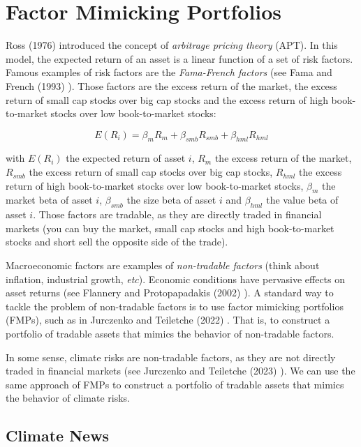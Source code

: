 \chapter{Factor Mimicking Portfolios}


Ross (1976) \cite{ross1976apt} introduced 
the concept of \textit{arbitrage pricing theory} (APT).
In this model, the expected return of an asset is
a linear function of a set of risk factors. Famous examples of risk factors are the
\textit{Fama-French factors} (see Fama and French (1993) \cite{fama1993common}).
Those factors are the excess return of the market,
the excess return of small cap stocks over big cap stocks
and the excess return of high book-to-market stocks over low book-to-market stocks:

\begin{equation}
    E(R_i) = \beta_m R_m + \beta_{smb} R_{smb} + \beta_{hml} R_{hml}
\end{equation}

with $E(R_i)$ the expected return of asset $i$,
$R_m$ the excess return of the market, $R_{smb}$ the excess return of small cap stocks over big cap stocks,
$R_{hml}$ the excess return of high book-to-market stocks over low book-to-market stocks,
$\beta_m$ the market beta of asset $i$, $\beta_{smb}$ the size beta of asset $i$ and $\beta_{hml}$ the value beta of asset $i$.
Those factors are tradable, as 
they are directly traded in financial markets (you can buy 
the market, small cap stocks and high book-to-market stocks
and short sell the opposite side of the trade).

Macroeconomic factors are examples of 
\textit{non-tradable factors} (think about inflation, 
industrial growth, \textit{etc}). Economic conditions 
have pervasive effects on asset returns (see Flannery 
and Protopapadakis (2002) \cite{flannery2002macroeconomic}).
A standard way to tackle the problem of non-tradable factors
is to use factor mimicking portfolios (FMPs), such 
as in Jurczenko and Teiletche (2022) \cite{jurczenko2022macro}. That is,
to construct a portfolio of tradable assets that
mimics the behavior of non-tradable factors. 


In some sense, climate risks are non-tradable factors,
as they are not directly traded in financial markets
(see Jurczenko and Teiletche (2023) \cite{jurczenko2023climate}).
We can use the same approach of FMPs to construct
a portfolio of tradable assets that mimics the behavior
of climate risks.

\section{Climate News}


